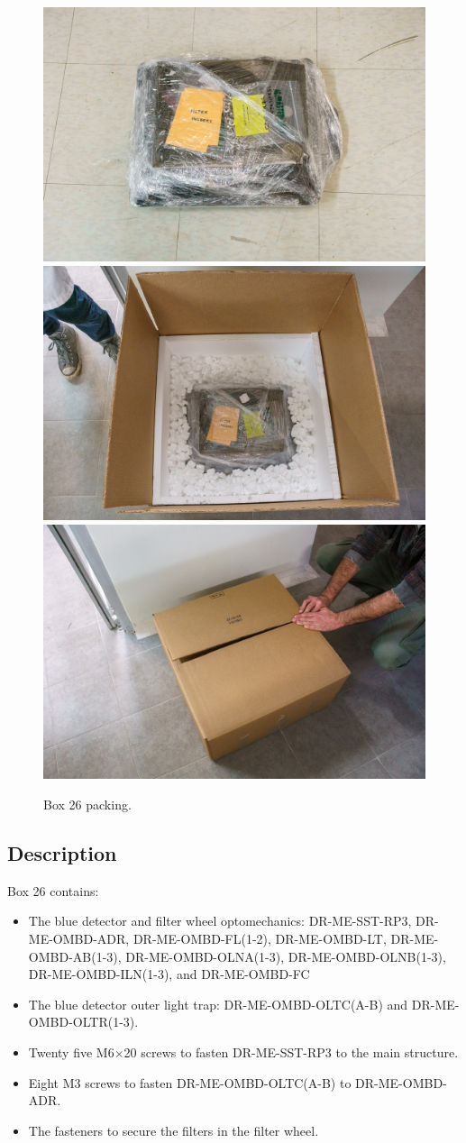 \documentclass{article}
\begin{document}
\begin{figure}[bp]
\begin{center}
\includegraphics[width=0.40\linewidth]{figures/20201208T174135.jpg}\\[\smallskipamount]
\includegraphics[width=0.40\linewidth]{figures/20201208T174256.jpg}\\[\smallskipamount]
\includegraphics[width=0.40\linewidth]{figures/20201208T174457.jpg}
\end{center}
\caption{Box 26 packing.}
\label{figure:box-twenty-six-packing}
\end{figure}

\subsection{Description}

Box 26 contains:

\begin{itemize}
    \item The blue detector and filter wheel optomechanics: DR-ME-SST-RP3, 
DR-ME-OMBD-ADR,
DR-ME-OMBD-FL(1-2),
DR-ME-OMBD-LT,
DR-ME-OMBD-AB(1-3),
DR-ME-OMBD-OLNA(1-3),
DR-ME-OMBD-OLNB(1-3),
DR-ME-OMBD-ILN(1-3), and
DR-ME-OMBD-FC
\item The blue detector outer light trap: DR-ME-OMBD-OLTC(A-B) and DR-ME-OMBD-OLTR(1-3).
\item Twenty five M6$\times$20 screws to fasten DR-ME-SST-RP3 to the main structure.
\item Eight M3 screws to fasten DR-ME-OMBD-OLTC(A-B) to DR-ME-OMBD-ADR.
\item The fasteners to secure the filters in the filter wheel.
\end{itemize}
\end{document}
